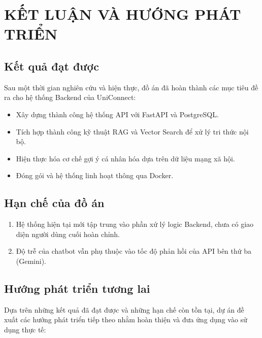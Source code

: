 \section{KẾT LUẬN VÀ HƯỚNG PHÁT TRIỂN}

\subsection{Kết quả đạt được}
Sau một thời gian nghiên cứu và hiện thực, đồ án đã hoàn thành các mục tiêu đề ra cho hệ thống Backend của UniConnect:
\begin{itemize}
    \item Xây dựng thành công hệ thống API với FastAPI và PostgreSQL.
    \item Tích hợp thành công kỹ thuật RAG và Vector Search để xử lý tri thức nội bộ.
    \item Hiện thực hóa cơ chế gợi ý cá nhân hóa dựa trên dữ liệu mạng xã hội.
    \item Đóng gói và hệ thống linh hoạt thông qua Docker.
\end{itemize}

\subsection{Hạn chế của đồ án}
\begin{enumerate}

    \item Hệ thống hiện tại mới tập trung vào phần xử lý logic Backend, chưa có giao diện người dùng cuối hoàn chỉnh.
    \item Độ trễ của chatbot vẫn phụ thuộc vào tốc độ phản hồi của API bên thứ ba (Gemini).
\end{enumerate}

\subsection{Hướng phát triển tương lai}
Dựa trên những kết quả đã đạt được và những hạn chế còn tồn tại, dự án đề xuất các hướng phát triển tiếp theo nhằm hoàn thiện và đưa ứng dụng vào sử dụng thực tế:


